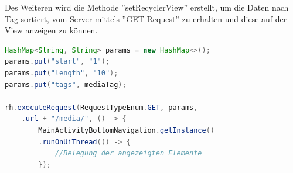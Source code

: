 Des Weiteren wird die Methode ''setRecyclerView'' erstellt, um die Daten nach Tag sortiert, vom Server mittels ''GET-Request'' zu erhalten und diese auf der View anzeigen zu können.


\begin{lstlisting}[language=Java,caption={Anfordern und anzeigen der Daten vom Server im MediaOverviewFragment}]
HashMap<String, String> params = new HashMap<>();
params.put("start", "1");
params.put("length", "10");
params.put("tags", mediaTag);
        
rh.executeRequest(RequestTypeEnum.GET, params, 										MainActivityBottomNavigation.getInstance()
    .url + "/media/", () -> {
    	MainActivityBottomNavigation.getInstance()
    	.runOnUiThread(() -> {
			//Belegung der angezeigten Elemente            
		});
\end{lstlisting}
